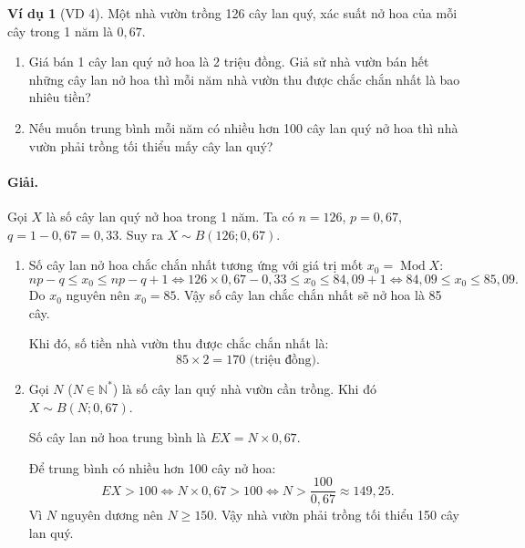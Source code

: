 \documentclass[12pt,a4paper]{article}
\theoremstyle{definition}
\newtheorem{vidu}{Ví dụ}[section]
\begin{document}
\begin{vidu}[VD 4]
Một nhà vườn trồng 126 cây lan quý, xác suất nở hoa của mỗi cây trong 1 năm là $0{,}67$.
\begin{enumerate}[label=\arabic*)]
    \item Giá bán 1 cây lan quý nở hoa là 2 triệu đồng. Giả sử nhà vườn bán hết những cây lan nở hoa thì mỗi năm nhà vườn thu được chắc chắn nhất là bao nhiêu tiền?
    \item Nếu muốn trung bình mỗi năm có nhiều hơn 100 cây lan quý nở hoa thì nhà vườn phải trồng tối thiểu mấy cây lan quý?
\end{enumerate}

\paragraph{Giải.}
Gọi $X$ là số cây lan quý nở hoa trong 1 năm. Ta có $n = 126$, $p = 0{,}67$, $q = 1 - 0{,}67 = 0{,}33$. Suy ra $X \sim B(126; 0{,}67)$.

\begin{enumerate}[label=\arabic*)]
    \item Số cây lan nở hoa chắc chắn nhất tương ứng với giá trị mốt $x_0 = \operatorname{Mod} X$:
    \[
    np - q \le x_0 \le np - q + 1 \iff 126 \times 0{,}67 - 0{,}33 \le x_0 \le 84{,}09 + 1 \iff 84{,}09 \le x_0 \le 85{,}09.
    \]
    Do $x_0$ nguyên nên $x_0 = 85$. Vậy số cây lan chắc chắn nhất sẽ nở hoa là 85 cây.
    
    Khi đó, số tiền nhà vườn thu được chắc chắn nhất là:
    \[
    85 \times 2 = 170 \text{ (triệu đồng)}.
    \]

    \item Gọi $N$ ($N \in \mathbb{N}^*$) là số cây lan quý nhà vườn cần trồng. Khi đó $X \sim B(N; 0{,}67)$.
    
    Số cây lan nở hoa trung bình là $EX = N \times 0{,}67$.
    
    Để trung bình có nhiều hơn 100 cây nở hoa:
    \[
    EX > 100 \iff N \times 0{,}67 > 100 \iff N > \frac{100}{0{,}67} \approx 149{,}25.
    \]
    Vì $N$ nguyên dương nên $N \ge 150$. Vậy nhà vườn phải trồng tối thiểu 150 cây lan quý.
\end{enumerate}
\end{vidu}
\end{document}

